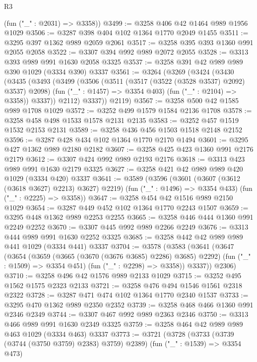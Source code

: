 \begin{lexlean}{R3}
\begin{coremodule}
      (fun ("_" : @2031) => @3358))
@3499 := @3258 @406 @42 @1464 @989 @1956 @1029
@3506 := @3287 @398 @404 @102 @1364 @1770 @2049 @1455
@3511 := @3295 @397 @1362 @989 @2059 @2061
@3517 := @3258 @395 @393 @1360 @991 @2055 @2058
@3522 := @3307 @394 @992 @989 @2072 @2055
@3528 := @3313 @393 @989 @991 @1630 @2058 @3325
@3537 := @3258 @391 @42 @989 @989 @390 @1029 (@3334 @390) @3337
@3561 := @3264
    (@3269
      (@3424
        (@3430
          (@3435
            (@3493
              (@3499
                (@3506
                  (@3511 (@3517 (@3522 (@3528 @3537) @2092) @3537) @2098)
                  (fun ("_" : @1457) => @3354 @403)
                  (fun ("_" : @2104) => @3358))
                @3337))
            @2112)
          @3337))
      @2119)
@3567 := @3258 @500 @42 @1585 @989 @1708 @1029
@3572 := @3252 @499 @1579 @1584 @2136 @1708
@3578 := @3258 @458 @498 @1533 @1578 @2131 @2135
@3583 := @3252 @457 @1519 @1532 @2153 @2131
@3589 := @3258 @436 @456 @1503 @1518 @2148 @2152
@3596 := @3287 @428 @434 @102 @1364 @1770 @2170 @1494
@3601 := @3295 @427 @1362 @989 @2180 @2182
@3607 := @3258 @425 @423 @1360 @991 @2176 @2179
@3612 := @3307 @424 @992 @989 @2193 @2176
@3618 := @3313 @423 @989 @991 @1630 @2179 @3325
@3627 := @3258 @421 @42 @989 @989 @420 @1029 (@3334 @420) @3337
@3641 := @3589
    (@3596
      (@3601 (@3607 (@3612 (@3618 @3627) @2213) @3627) @2219)
      (fun ("_" : @1496) => @3354 @433)
      (fun ("_" : @2225) => @3358))
@3647 := @3258 @454 @42 @1516 @989 @2150 @1029
@3654 := @3287 @449 @452 @102 @1364 @1770 @2243 @1507
@3659 := @3295 @448 @1362 @989 @2253 @2255
@3665 := @3258 @446 @444 @1360 @991 @2249 @2252
@3670 := @3307 @445 @992 @989 @2266 @2249
@3676 := @3313 @444 @989 @991 @1630 @2252 @3325
@3685 := @3258 @442 @42 @989 @989 @441 @1029 (@3334 @441) @3337
@3704 := @3578
    (@3583
      (@3641
        (@3647
          (@3654
            (@3659 (@3665 (@3670 (@3676 @3685) @2286) @3685) @2292)
            (fun ("_" : @1509) => @3354 @451)
            (fun ("_" : @2298) => @3358))
          @3337))
      @2306)
@3710 := @3258 @496 @42 @1576 @989 @2133 @1029
@3715 := @3252 @495 @1562 @1575 @2323 @2133
@3721 := @3258 @476 @494 @1546 @1561 @2318 @2322
@3728 := @3287 @471 @474 @102 @1364 @1770 @2340 @1537
@3733 := @3295 @470 @1362 @989 @2350 @2352
@3739 := @3258 @468 @466 @1360 @991 @2346 @2349
@3744 := @3307 @467 @992 @989 @2363 @2346
@3750 := @3313 @466 @989 @991 @1630 @2349 @3325
@3759 := @3258 @464 @42 @989 @989 @463 @1029 (@3334 @463) @3337
@3773 := @3721
    (@3728
      (@3733 (@3739 (@3744 (@3750 @3759) @2383) @3759) @2389)
      (fun ("_" : @1539) => @3354 @473)

\end{coremodule}
\end{lexlean}
